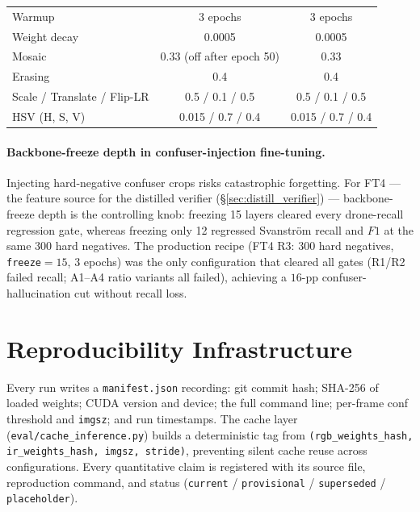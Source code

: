 \begin{table}[htbp]
\begin{tabular}{lcc}
        Warmup            & 3 epochs                   & 3 epochs                                    \\
        Weight decay      & 0.0005                     & 0.0005                                      \\
        Mosaic            & 0.33 (off after epoch 50)  & 0.33                                        \\
        Erasing           & 0.4                        & 0.4                                         \\
        Scale / Translate / Flip-LR & 0.5 / 0.1 / 0.5  & 0.5 / 0.1 / 0.5                             \\
        HSV (H, S, V)     & 0.015 / 0.7 / 0.4          & 0.015 / 0.7 / 0.4                           \\
        \bottomrule
    \end{tabular}
\end{table}

\paragraph{Backbone-freeze depth in confuser-injection fine-tuning.}
Injecting hard-negative confuser crops risks catastrophic forgetting. For FT4 --- the feature source for the distilled verifier (\S\ref{sec:distill_verifier}) --- backbone-freeze depth is the controlling knob: freezing 15 layers cleared every drone-recall regression gate, whereas freezing only 12 regressed Svanstr\"om recall and $F1$ at the same $300$ hard negatives. The production recipe (FT4 R3: $300$ hard negatives, \texttt{freeze}$=15$, $3$ epochs) was the only configuration that cleared all gates (R1/R2 failed recall; A1--A4 ratio variants all failed), achieving a $16$-pp confuser-hallucination cut without recall loss.

\section{Reproducibility Infrastructure}
\label{sec:reproducibility}

Every run writes a \texttt{manifest.json} recording: git commit hash; SHA-256 of loaded weights; CUDA version and device; the full command line; per-frame conf threshold and \texttt{imgsz}; and run timestamps. The cache layer (\texttt{eval/cache\_inference.py}) builds a deterministic tag from \texttt{(rgb\_weights\_hash, ir\_weights\_hash, imgsz, stride)}, preventing silent cache reuse across configurations. Every quantitative claim is registered with its source file, reproduction command, and status (\texttt{current} / \texttt{provisional} / \texttt{superseded} / \texttt{placeholder}).

